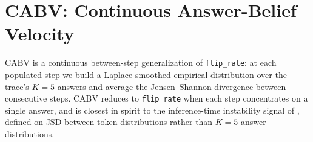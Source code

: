 \documentclass[11pt]{article}
\begin{document}
\begin{table}[h]
\centering
{}
\caption{Operational differences across three concurrent commitment-time primitives. \citet{datta_large_2026}'s $t^\star$ is backward-looking on per-step intermediate answers, applied to early stopping. \citet{zhang_when_2026}'s $\tau_{\text{commit}}$ is forward-looking on the model's finite-answer continuation distribution (log-odds in binary tasks), applied to pre-verbalization commitment analysis. FCT (ours) is forward-looking on $K{=}5$-majority answer extracts, applied to retrieval triggering. For monotonically converging trajectories, $t_{\text{commit}} \approx t^\star + 1$; under $K{=}5$ majority sampling on non-thinking-mode chat models this equivalence does not hold in general.}
\label{tab:fct-vs-tstar}
\end{table}

\section{CABV: Continuous Answer-Belief Velocity}
\label{sec:appendix-cabv}

CABV is a continuous between-step generalization of \texttt{flip\_rate}: at each populated step we build a Laplace-smoothed empirical distribution over the trace's $K{=}5$ answers and average the Jensen--Shannon divergence between consecutive steps. CABV reduces to \texttt{flip\_rate} when each step concentrates on a single answer, and is closest in spirit to the inference-time instability signal of \citet{chen_i_2026}, defined on JSD between token distributions rather than $K{=}5$ answer distributions.
\end{document}

